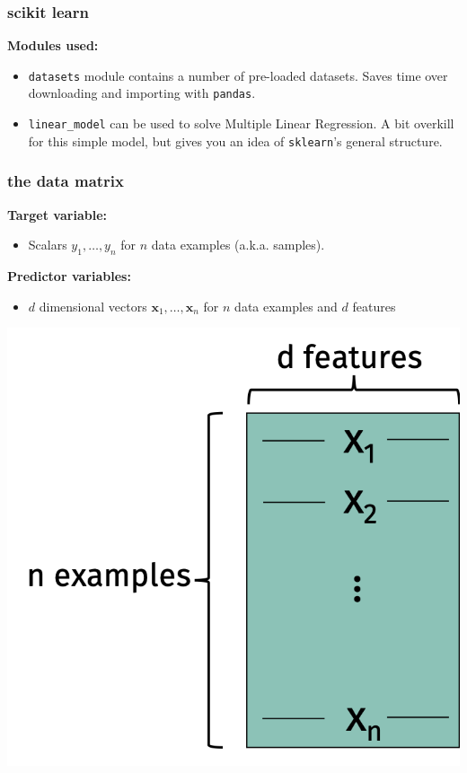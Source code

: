 \documentclass[handout,compress]{beamer}
\newcommand{\bv}[1]{\mathbf{#1}}
\begin{document}
\begin{frame}
	\frametitle{scikit learn}
	\textbf{Modules used:}
	\begin{itemize}
		\item \texttt{datasets} module contains a number of pre-loaded datasets. Saves time over downloading and importing with \texttt{pandas}. 
		\item \texttt{linear\_model} can be used to solve Multiple Linear Regression. A bit overkill for this simple model, but gives you an idea of \texttt{sklearn}'s general structure.
	\end{itemize}
\end{frame}

\begin{frame}
	\frametitle{the data matrix}
	\textbf{Target variable:}
	\begin{itemize}
		\item Scalars $y_1, \ldots, y_n$ for $n$ data examples (a.k.a. samples).
	\end{itemize}
	\textbf{Predictor variables:}
	\begin{itemize}
		\item $d$ dimensional vectors $\bv{x}_1, \ldots, \bv{x}_n$ for $n$ data examples and $d$ features
	\end{itemize}
\vspace{-1.5em}

	\begin{center}
		\includegraphics[width=.45\textwidth]{data_matrix_examples.png}
	\end{center}
\end{frame}
\end{document}

